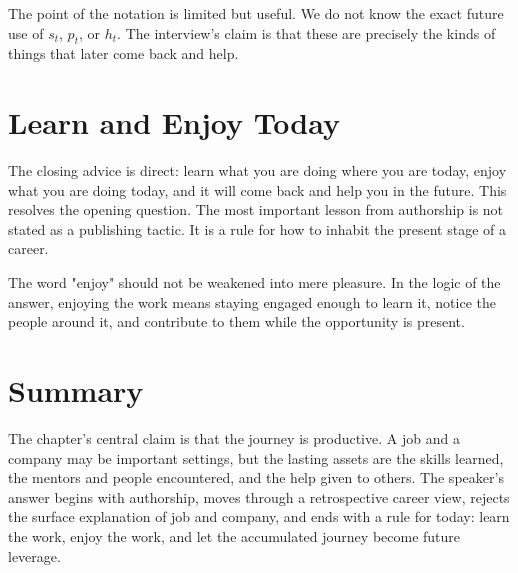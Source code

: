 The point of the notation is limited but useful. We do not know the exact future use of \(s_t\), \(p_t\), or \(h_t\). The interview's claim is that these are precisely the kinds of things that later come back and help.

\section{Learn and Enjoy Today}

The closing advice is direct: learn what you are doing where you are today, enjoy what you are doing today, and it will come back and help you in the future. This resolves the opening question. The most important lesson from authorship is not stated as a publishing tactic. It is a rule for how to inhabit the present stage of a career.

The word "enjoy" should not be weakened into mere pleasure. In the logic of the answer, enjoying the work means staying engaged enough to learn it, notice the people around it, and contribute to them while the opportunity is present.

\section{Summary}

The chapter's central claim is that the journey is productive. A job and a company may be important settings, but the lasting assets are the skills learned, the mentors and people encountered, and the help given to others. The speaker's answer begins with authorship, moves through a retrospective career view, rejects the surface explanation of job and company, and ends with a rule for today: learn the work, enjoy the work, and let the accumulated journey become future leverage.